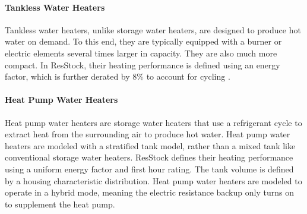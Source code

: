 \paragraph{Tankless Water Heaters}
Tankless water heaters, unlike storage water heaters, are designed to produce hot water on demand. To this end, they are typically equipped with a burner or electric elements several times larger in capacity. They are also much more compact. In ResStock, their heating performance is defined using an energy factor, which is further derated by 8\% to account for cycling \citep{ansi_resnet_301_2019}.

\paragraph{Heat Pump Water Heaters}
Heat pump water heaters are storage water heaters that use a refrigerant cycle to extract  heat from the surrounding air to produce hot water. Heat pump water heaters are modeled with a stratified tank model, rather than a mixed tank like conventional storage water heaters. ResStock defines their heating performance using a uniform energy factor and first hour rating.  The tank volume is defined by a housing characteristic distribution. Heat pump water heaters are modeled to operate in a hybrid mode, meaning the electric resistance backup only turns on to supplement the heat pump.


